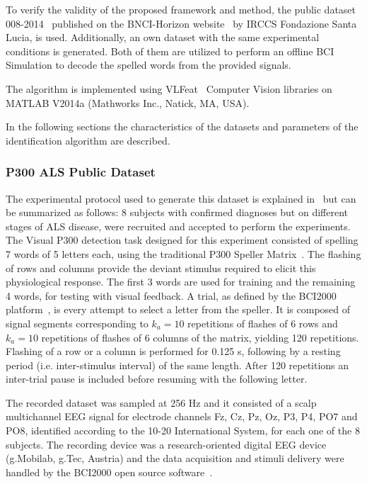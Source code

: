 \documentclass[utf8]{frontiersSCNS} %
\begin{document}
To verify the validity of the proposed framework and method, the public dataset 008-2014~\citep{Riccio2013} published on the BNCI-Horizon website~\citep{Brunner2014} by  IRCCS Fondazione Santa Lucia, is used. Additionally, an own dataset with the same experimental conditions is generated. Both of them are utilized to perform an offline BCI Simulation to decode the spelled words from the provided signals. 

The algorithm is implemented using  VLFeat~\citep{Vedaldi2010} Computer Vision libraries on MATLAB V2014a (Mathworks Inc., Natick, MA, USA). 

In the following sections the characteristics of the datasets and parameters of the identification algorithm are described. 

\subsubsection{P300 ALS Public Dataset} \label{ALSDataset}

The experimental protocol used to generate this dataset is explained in~\citep{Riccio2013} but can be summarized as follows:  8 subjects with confirmed diagnoses but on different stages of ALS disease, were recruited and accepted to perform the experiments. The Visual P300 detection task designed for this experiment consisted of spelling 7 words of 5 letters each, using the traditional P300 Speller Matrix~\citep{Farwell1988}. The flashing of rows and columns provide the deviant stimulus required to elicit this physiological response.  The first 3 words are used for training and the remaining 4 words, for testing with visual feedback.  A trial, as defined by the BCI2000 platform~\citep{Schalk2004}, is every attempt to select a letter from the speller. It is composed of signal segments corresponding to $k_a =10$ repetitions of flashes of 6 rows and $k_a =10$ repetitions of flashes of 6 columns of the matrix, yielding 120 repetitions.  Flashing of a row or a column is performed for 0.125 s, following by a resting period (i.e. inter-stimulus interval) of the same length.  After 120 repetitions an inter-trial pause is included before resuming with the following letter.

The recorded dataset was sampled at 256 Hz and it consisted of a scalp multichannel EEG signal for electrode channels Fz, Cz, Pz, Oz, P3, P4, PO7 and PO8, identified according to the 10-20 International System,  for each one of the 8 subjects.   The recording device was a research-oriented digital EEG device (g.Mobilab, g.Tec, Austria) and the data acquisition and stimuli delivery were handled by the BCI2000 open source software~\citep{Schalk2004}.
\end{document}

